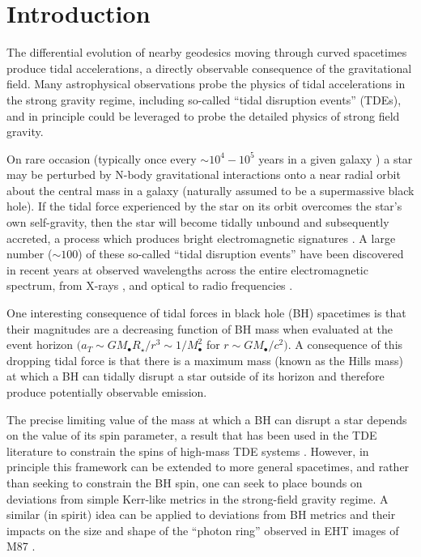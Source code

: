 \documentclass[
    reprint,
    prd,
    nofootinbib,
    amsmath,amssymb,
    aps,
    floatfix,
]{revtex4-2}
\begin{document}


\section{Introduction}


The differential evolution of nearby geodesics moving through curved spacetimes produce tidal accelerations, a directly observable consequence of the gravitational field. Many astrophysical observations probe the physics of tidal accelerations in the strong gravity regime, including so-called ``tidal disruption events'' (TDEs), and in principle could be leveraged to probe the detailed physics of strong field gravity. 

On rare occasion (typically once every $\sim 10^4-10^5$ years in a given galaxy \cite{Magorrian99}) a star may be perturbed by N-body gravitational interactions onto a near radial orbit about the central mass in a galaxy (naturally assumed to be a supermassive black hole). If the tidal force experienced by the star on its orbit overcomes the star's own self-gravity, then the star will become tidally unbound and subsequently accreted, a process which produces bright electromagnetic signatures \cite{Rees88}. A large number ($\sim 100$) of these so-called ``tidal disruption events'' have been discovered in recent years at observed wavelengths across the entire electromagnetic spectrum, from X-rays \citep[e.g.,][]{Greiner00, Cenko12, Guolo24, Grotova25}, and optical \citep[e.g.,][]{Gezari08, vanVelzen20, Hammerstein23, Yao23, Mummery_et_al_2024} to radio frequencies \citep[e.g.,][]{Alexander16, Goodwin22, Goodwin25}. 

One interesting consequence of tidal forces in black hole (BH) spacetimes is that their magnitudes are a decreasing function of BH mass when evaluated at the event horizon $(a_T \sim GM_\bullet R_\star/r^3 \sim 1/M_\bullet^2$ for $r\sim GM_\bullet/c^2)$. A consequence of this dropping tidal force is that there is a maximum mass (known as the Hills \cite{Hills1975} mass) at which a BH can tidally disrupt a star outside of its horizon and therefore produce potentially observable emission. 

The precise limiting value of the mass at which a BH can disrupt a star depends on the value of its spin parameter, a result that has been used in the TDE literature to constrain the spins of high-mass TDE systems \citep[e.g.,][]{Kesden12, Mummery2023, Mummery_et_al_2024}. However, in principle this framework can be extended to more general spacetimes, and rather than seeking to constrain the BH spin, one can seek to place bounds on deviations from simple Kerr-like metrics in the strong-field gravity regime. A similar (in spirit) idea can be applied to deviations from BH metrics and their impacts on the size and shape of the ``photon ring'' observed in EHT images of M87 \citep[e.g.,][]{EHT19, EHT2021}. 
\end{document}
